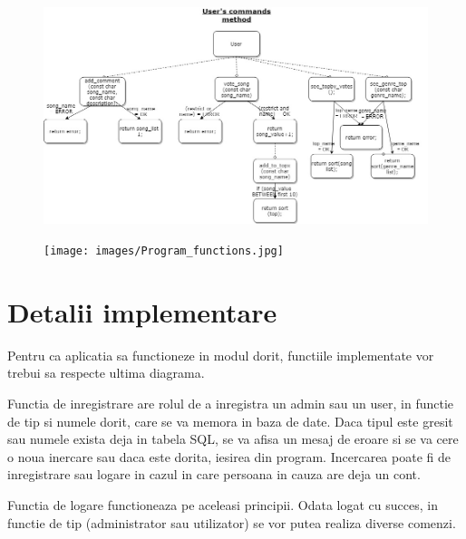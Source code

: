 \documentclass[a4paper]{article}
\begin{document}
\begin{figure}[H]
\centering
\includegraphics[width=\linewidth]{images/Diagram_user_commands.jpg}
\end{figure}
 
\endgroup
\vspace*{\fill}

\newpage

\vspace*{\fill}
\begingroup
\centering

\begin{figure}[H]
\texttt{[image: images/Program\_functions.jpg]}
\end{figure}
 
\endgroup
\vspace*{\fill}

\newpage

\section{Detalii implementare}

\quad Pentru ca aplicatia sa functioneze in modul dorit, functiile implementate vor trebui sa respecte ultima diagrama. 

Functia de inregistrare are rolul de a inregistra un admin sau un user, in functie de tip si numele dorit, care se va memora in baza de date. Daca tipul este gresit sau numele exista deja in tabela SQL, se va afisa un mesaj de eroare si se va cere o noua inercare sau daca este dorita, iesirea din program. Incercarea poate fi de inregistrare sau logare in cazul in care persoana in cauza are deja un cont. 

Functia de logare functioneaza pe aceleasi principii. Odata logat cu succes, in functie de tip (administrator sau utilizator) se vor putea realiza diverse comenzi. 
\end{document}

